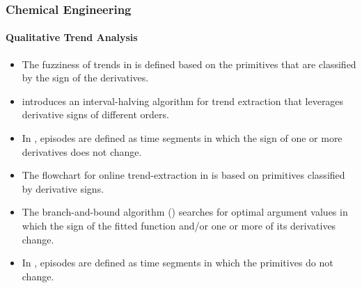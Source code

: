 \documentclass[11pt]{book}
\begin{document}
\subsubsection{Chemical Engineering}
\paragraph{Qualitative Trend Analysis}
\begin{itemize}
\item The fuzziness of trends in \cite{dash2003fuzzy}
is defined based on the primitives that are classified by the sign
of the derivatives.
\item \cite{dash2004novel}
introduces an interval-halving algorithm for trend extraction that
leverages derivative signs of different orders.
\item In \cite{maurya2007signed},
episodes are defined as time segments in which the sign of one or
more derivatives does not change.
\item The flowchart for online trend-extraction in \cite{maurya2010framework}
is based on primitives classified by derivative signs.
\item The branch-and-bound algorithm (\cite{villez2013generalized})
searches for optimal argument values in which the sign of the fitted
function and/or one or more of its derivatives change.
\item In \cite{villez2014qualitative,thurlimannqualitative,villez2016shape,thurlimann2018soft},
episodes are defined as time segments in which the primitives do not
change.
\end{itemize}
\end{document}
